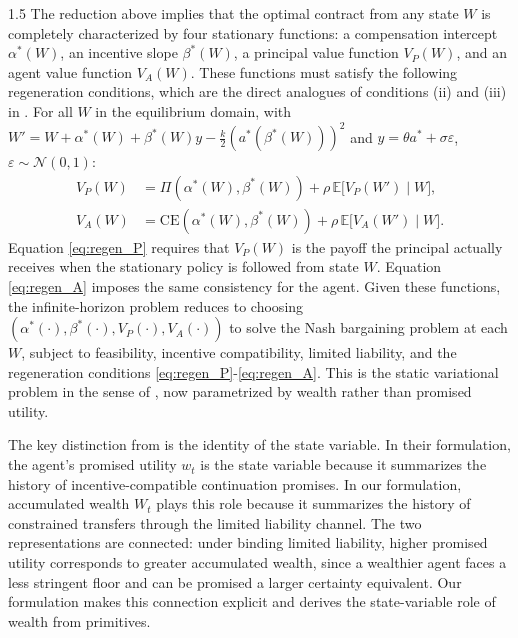 \documentclass[12pt]{article}
\theoremstyle{definition}
\theoremstyle{plain}
\begin{document}
\begin{spacing}{1.5}
The reduction above implies that the optimal contract from any state $W$ is completely characterized by four stationary functions: a compensation intercept $\alpha^*(W)$, an incentive slope $\beta^*(W)$, a principal value function $V_P(W)$, and an agent value function $V_A(W)$. These functions must satisfy the following regeneration conditions, which are the direct analogues of conditions (ii) and (iii) in \textcite{spear1987}. For all $W$ in the equilibrium domain, with $W' = W + \alpha^*(W) + \beta^*(W)y - \frac{k}{2}(a^*(\beta^*(W)))^2$ and $y = \theta a^* + \sigma\varepsilon$, $\varepsilon \sim \mathcal{N}(0,1)$:
\begin{align}
V_P(W) &= \Pi(\alpha^*(W), \beta^*(W)) + \rho\,\mathbb{E}\bigl[V_P(W') \mid W\bigr], \label{eq:regen_P} \\
V_A(W) &= \mathrm{CE}(\alpha^*(W), \beta^*(W)) + \rho\,\mathbb{E}\bigl[V_A(W') \mid W\bigr]. \label{eq:regen_A}
\end{align}
Equation \eqref{eq:regen_P} requires that $V_P(W)$ is the payoff the principal actually receives when the stationary policy is followed from state $W$. Equation \eqref{eq:regen_A} imposes the same consistency for the agent. Given these functions, the infinite-horizon problem reduces to choosing $(\alpha^*(\cdot), \beta^*(\cdot), V_P(\cdot), V_A(\cdot))$ to solve the Nash bargaining problem at each $W$, subject to feasibility, incentive compatibility, limited liability, and the regeneration conditions \eqref{eq:regen_P}-\eqref{eq:regen_A}. This is the static variational problem in the sense of \textcite{spear1987}, now parametrized by wealth rather than promised utility.

The key distinction from \textcite{spear1987} is the identity of the state variable. In their formulation, the agent's promised utility $w_t$ is the state variable because it summarizes the history of incentive-compatible continuation promises. In our formulation, accumulated wealth $W_t$ plays this role because it summarizes the history of constrained transfers through the limited liability channel. The two representations are connected: under binding limited liability, higher promised utility corresponds to greater accumulated wealth, since a wealthier agent faces a less stringent floor and can be promised a larger certainty equivalent. Our formulation makes this connection explicit and derives the state-variable role of wealth from primitives.


\end{spacing}
\end{document}
